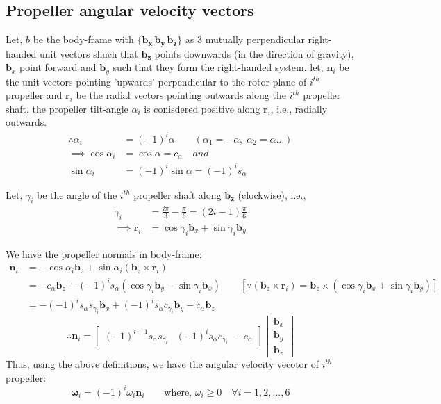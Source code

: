 \medskip

\subsection{Propeller angular velocity vectors}
Let, $b$ be the body-frame with $\{\pmb{b_x \, b_y \, b_z}\}$ as 3 mutually perpendicular right-handed unit vectors shuch that $\pmb{b_z}$ points downwards (in the direction of gravity), $\pmb{b}_x$ point forward and $\pmb{b}_y$ such that they form the right-handed system. let, $\pmb{n}_i$ be the unit vectors pointing 'upwards' perpendicular to the rotor-plane of $i^{th}$ propeller and $\pmb{r}_i$ be the radial vectors pointing outwards along the $i^{th}$ propeller shaft. the propeller tilt-angle $\alpha_i$ is conisdered positive along $\pmb{r}_i$, i.e., radially outwards.
\begin{align*}
   \therefore \alpha_i &= (-1)^{i} \alpha \qquad (\alpha_1 = -\alpha, \; \alpha_2 = \alpha \hdots) \\
   \implies \cos \alpha_i &= \cos \alpha  = c_{\alpha} \quad and\\
   \sin \alpha_i &= (-1)^{i} \sin \alpha = (-1)^{i} s_{\alpha}
\end{align*}

Let, $\gamma_i$ be the angle of the $i^{th}$ propeller shaft along $\pmb{b_z}$ (clockwise), i.e.,
\begin{align*}
\gamma_i &= \frac{i\pi}{3} - \frac{\pi}{6} = (2i-1)\frac{\pi}{6}\\
\implies \pmb r_i &= \cos \gamma_i \pmb b_x + \sin \gamma_i \pmb b_y
\end{align*}

We have the propeller normals in body-frame:
\begin{align*}
    \pmb{n}_i &= -\cos \alpha_i \pmb{b}_z + \sin \alpha_i ( \pmb b_z \times \pmb r_i)\\
    &= -c_{\alpha} \pmb b_z + (-1)^{i} s_{\alpha}( \cos \gamma_i \pmb b_y - \sin \gamma_i \pmb b_x) \qquad
    [\because ( \pmb b_z \times \pmb r_i) = \pmb b_z \times (\cos \gamma_i \pmb b_x + \sin \gamma_i \pmb b_y)]\\
    &= -(-1)^i s_{\alpha} s_{\gamma_i} \pmb b_x + (-1)^{i} s_{\alpha} c_{\gamma_i} \pmb b_y - c_{\alpha} \pmb b_z
\end{align*}
$$\therefore \pmb{n}_i = \begin{bmatrix}
    (-1)^{i+1} s_{\alpha} s_{\gamma_i} &  (-1)^{i} s_{\alpha} c_{\gamma_i} & - c_{\alpha}
\end{bmatrix} \begin{bmatrix}
    \pmb b_x \\ \pmb b_y \\ \pmb b_z
\end{bmatrix}
$$
Thus, using the above definitions, we have the angular velocity vecotor of $i^{th}$ propeller:
$$\pmb \omega_i = (-1)^{i} \omega_i \pmb n_i \qquad \text{where, }\omega_i \geq 0 \quad \forall i = 1, 2, \hdots, 6$$

